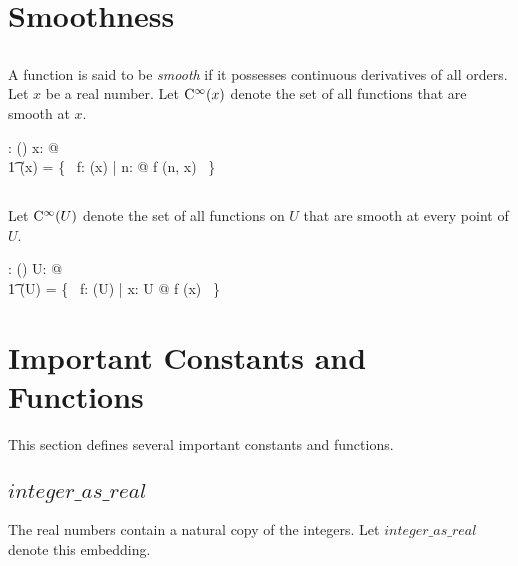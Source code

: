 \documentclass{amsart}
\begin{document}
\section{Smoothness}

\subsection{}

A function is said to be {\it smooth} if it possesses continuous derivatives of all orders.
Let $x$ be a real number.
Let $\operatorname{C^{\infty}}(x)$ denote the set of all functions that are smooth at $x$.

\begin{axdef}
	\smoothR: \R \fun \power(\R \pfun \R)
\where
	\forall x: \R @ \\
	\t1	\smoothR(x) = \{~ f: \FunR(x) | \forall n: \nat @ f \in \CnR(n, x) ~\}
\end{axdef}

\subsection{}

Let $\operatorname{C^{\infty}}(U)$ denote the set of all functions on $U$ that are smooth at every point of $U$.

\begin{axdef}
	\smoothPR: \power \R \fun \power (\R \pfun \R)
\where
	\forall U: \power \R @ \\
	\t1	\smoothPR(U) = \{~ f: \FunPR(U) | \forall x: U @ f \in \smoothR(x) ~\}
\end{axdef}

\section{Important Constants and Functions}

This section defines several important constants and functions.

\subsection{$integer\_as\_real$}

The real numbers contain a natural copy of the integers.
Let $integer\_as\_real$ denote this embedding.

\end{document}
